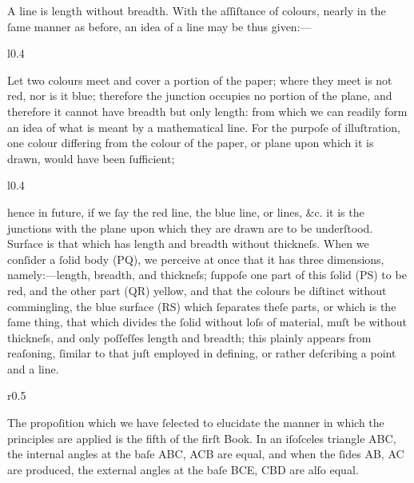 A line is length without breadth. With the aſſiſtance of colours, nearly in the ſame manner as before, an idea of a line may be thus given:—\\
\begin{wrapfigure}{l}{0.4\textwidth}
    \centering
    
\end{wrapfigure}
Let two colours meet and cover a portion of the paper; where they meet is not red, nor is it blue; therefore the junction occupies no portion of the plane, and therefore it cannot have breadth but only length: from which we can readily form an idea of what is meant by a mathematical line. For the purpoſe of illuſtration, one colour differing from the colour of the paper, or plane upon which it is drawn, would have been ſufficient;
\begin{wrapfigure}{l}{0.4\textwidth}
    \centering
    
\end{wrapfigure}
hence in future, if we ſay the red line, the blue line, or lines, \&c. it is the junctions with the plane upon which they are drawn are to be underſtood.\\

Surface is that which has length and breadth without thickneſs.
When we conſider a ſolid body (PQ), we perceive at once that it has three dimensions, namely:—length, breadth, and thickneſs;  ſuppoſe one part of this ſolid (PS) to be red, and the other part (QR) yellow, and that the colours be diſtinct without commingling, the blue surface (RS) which ſeparates theſe parts, or which is the ſame thing, that which divides the ſolid without loſs of material, muſt be without thickneſs, and only poſſeſſes length and breadth; this plainly appears from reaſoning, ſimilar to that juſt employed in defining, or rather deſcribing a point and a line.\\

\hfill

\begin{wrapfigure}{r}{0.5\textwidth}
    \centering
    
\end{wrapfigure}
The propoſition which we have ſelected to elucidate the manner in which the principles are applied is the fifth of the firſt Book.  In an iſoſceles triangle ABC, the internal angles at the baſe ABC, ACB are equal, and when the ſides AB, AC are produced, the external angles at the baſe BCE, CBD are alſo equal.\\

